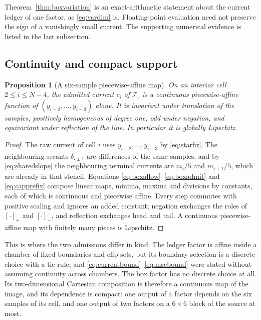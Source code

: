 \documentclass[journal]{IEEEtran}
\newtheorem{proposition}{Proposition}
\newcommand{\Tcal}{\mathcal{T}}
\begin{document}
Theorem~\ref{thm:boxvariation} is an exact-arithmetic statement about
the current ledger of one factor, as \eqref{eq:vardim} is. Floating-point
evaluation need not preserve the sign of a vanishingly small current.
The supporting numerical evidence is listed in the last subsection.

\subsection{Continuity and compact support}

\begin{proposition}[A six-sample piecewise-affine map]
\label{prop:boxcontinuous}
On an interior cell \(2\le i\le N-4\), the admitted current \(c_i\) of
\(\Tcal_\square\) is a continuous piecewise-affine function of
\((y_{i-2},\ldots,y_{i+3})\) alone. It is invariant under translation of
the samples, positively homogeneous of degree one, odd under negation,
and equivariant under reflection of the line. In particular it is
globally Lipschitz.
\end{proposition}

\begin{proof}
The raw current of cell \(i\) uses \(y_{i-2},\ldots,y_{i+3}\) by
\eqref{eq:starfir}. The neighbouring secants \(\delta_{i\pm1}\) are
differences of the same samples, and by \eqref{eq:sharedslope} the
neighbouring terminal currents are \(m_i/5\) and \(m_{i+1}/5\), which
are already in that stencil. Equations
\eqref{eq:boxallow}--\eqref{eq:boxadmit} and \eqref{eq:capprefix}
compose linear maps, minima, maxima and divisions by constants, each of
which is continuous and piecewise affine. Every step commutes with
positive scaling and ignores an added constant; negation exchanges the
roles of \([\cdot]_+\) and \([\cdot]_-\), and reflection exchanges head
and tail. A continuous piecewise-affine map with finitely many pieces is
Lipschitz.
\end{proof}

This is where the two admissions differ in kind. The ledger factor is
affine inside a chamber of fixed boundaries and clip sets, but its
boundary selection is a discrete choice with a tie rule, and
\eqref{eq:currentbound}--\eqref{eq:msebound} were stated without
assuming continuity across chambers. The box factor has no discrete
choice at all. Its two-dimensional Cartesian composition is therefore a
continuous map of the image, and its dependence is compact: one output
of a factor depends on the six samples of its cell, and one output of
two factors on a \(6\times6\) block of the source at most.
\end{document}
